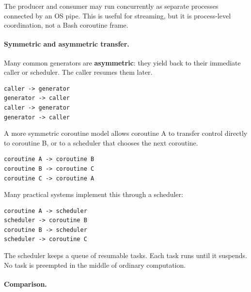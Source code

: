 The producer and consumer may run concurrently as separate processes connected by an OS pipe. This is useful for streaming, but it is process-level coordination, not a Bash coroutine frame.

\paragraph{Symmetric and asymmetric transfer.}

Many common generators are \textbf{asymmetric}: they yield back to their immediate caller or scheduler. The caller resumes them later.

\begin{verbatim}
caller -> generator
generator -> caller
caller -> generator
generator -> caller
\end{verbatim}

A more symmetric coroutine model allows coroutine A to transfer control directly to coroutine B, or to a scheduler that chooses the next coroutine.

\begin{verbatim}
coroutine A -> coroutine B
coroutine B -> coroutine C
coroutine C -> coroutine A
\end{verbatim}

Many practical systems implement this through a scheduler:

\begin{verbatim}
coroutine A -> scheduler
scheduler -> coroutine B
coroutine B -> scheduler
scheduler -> coroutine C
\end{verbatim}

The scheduler keeps a queue of resumable tasks. Each task runs until it suspends. No task is preempted in the middle of ordinary computation.

\paragraph{Comparison.}

